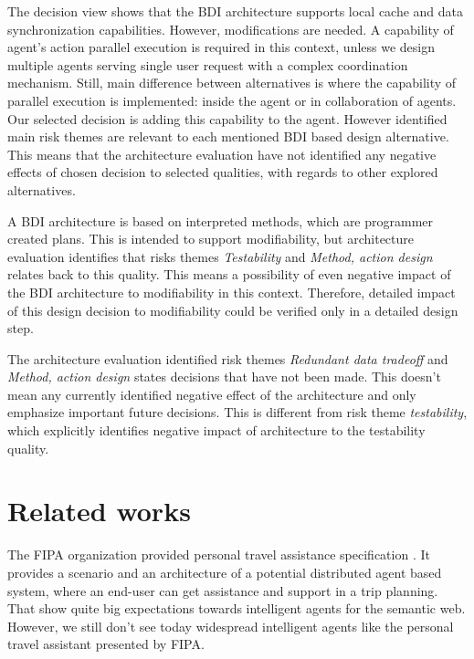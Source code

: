\documentclass{llncs}
\begin{document}
The decision view shows that the \gls{BDI} architecture supports local cache and data synchronization capabilities. However, modifications are needed. A capability of agent's action parallel execution is required in this context, unless we design multiple agents serving single user request with a complex coordination mechanism.  Still, main difference between alternatives is where the capability of parallel execution  is implemented: inside the agent or in collaboration of agents. Our selected decision is adding this capability to the agent. However identified main risk themes are relevant to each mentioned \gls{BDI} based design alternative. This means that the architecture evaluation have not identified any negative effects of chosen decision to selected qualities, with regards to other explored alternatives.
% 

A \gls{BDI} architecture is based on interpreted methods, which are programmer created plans. This is intended to support modifiability, but architecture evaluation identifies that risks themes \emph{Testability} and \emph{Method, action design} relates back to this quality. This means a possibility of even negative impact of the \gls{BDI} architecture to modifiability in this context. Therefore, detailed impact of this design decision to modifiability could be verified only in a detailed design step.

The architecture evaluation identified risk themes \emph{Redundant data tradeoff} and \emph{Method, action design} states decisions that have not been made. This doesn't mean any currently identified negative effect of the architecture and only emphasize important future decisions. This is different from risk theme \emph{testability}, which explicitly identifies negative impact of architecture to the testability quality.

\section{Related works}

The \gls{FIPA} organization provided personal travel assistance specification \cite{fipa000132000fipa}. It provides a scenario and an architecture of a potential distributed agent based system, where an end-user can get assistance and support in a trip planning. That show quite big expectations towards intelligent agents for the semantic web. However, we still don't see today widespread intelligent agents like the personal travel assistant presented by \gls{FIPA}.
\end{document}
